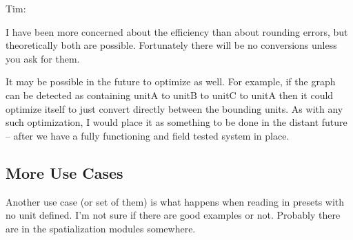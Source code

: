 \documentclass[]{article}
\begin{document}
Tim:

I have been more concerned about the efficiency than about rounding errors, but theoretically both are possible.  Fortunately there will be no conversions unless you ask for them.  

It may be possible in the future to optimize as well.  For example, if the graph can be detected as containing unitA to unitB to unitC to unitA then it could optimize itself to just convert directly between the bounding units.  As with any such optimization, I would place it as something to be done in the distant future -- after we have a fully functioning and field tested system in place.


\subsection{More Use Cases}

Another use case (or set of them) is what happens when reading in presets with no unit defined.  I'm not sure if there are good examples or not.  Probably there are in the spatialization modules somewhere.







\end{document}
